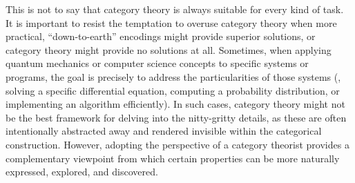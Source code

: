 This is not to say that category theory is always suitable for every kind of task. 
It is important to resist the temptation to overuse category theory when more practical, ``down-to-earth'' encodings might provide superior solutions, or category theory might provide no solutions at all.
Sometimes, when applying quantum mechanics or computer science concepts to specific systems or programs, the goal is precisely to address the particularities of those systems (\eg, solving a specific differential equation, computing a probability distribution, or implementing an algorithm efficiently).
In such cases, category theory might not be the best framework for delving into the nitty-gritty details, as these are often intentionally abstracted away and rendered invisible within the categorical construction. 
However, adopting the perspective of a category theorist provides a complementary viewpoint from which certain properties can be more naturally expressed, explored, and discovered.


\smallskip

\noindent\textsw{\myLocation, \myTime}


\begin{flushright}
        \myName
\end{flushright}

